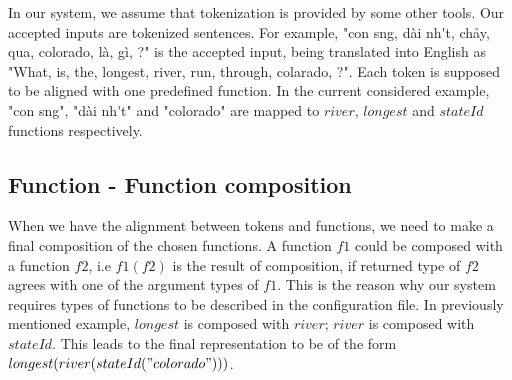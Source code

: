 In our system, we assume that tokenization is provided by some other tools. Our accepted inputs are tokenized sentences. For example, "{\selectfont con s\ocircumflex ng, d\`ai nh\'\acircumflex t, ch\h{a}y, qua, colorado, l\`a, g\`i, ?}" is the accepted input, being translated into English as "What, is, the, longest, river, run, through, colarado, ?". Each token is supposed to be aligned with one predefined function. In the current considered example, "{\selectfont con s\ocircumflex ng", "d\`ai nh\'\acircumflex t" and "colorado"} are mapped to $river$, $longest$ and $stateId$ functions respectively. 

\subsection{Function - Function composition}
\label{subsec:fun-fun}
When we have the alignment between tokens and functions, we need to make a final composition of the chosen functions. A function $f1$ could be composed with a function $f2$, i.e $f1(f2)$ is the result of composition, if returned type of $f2$ agrees with one of the argument types of $f1$. This is the reason why our system requires types of functions to be described in the configuration file. In previously mentioned example, $longest$ is composed with $river$; $river$ is composed with $stateId$. This leads to the final representation to be of the form $longest(river(stateId("colorado")))$.